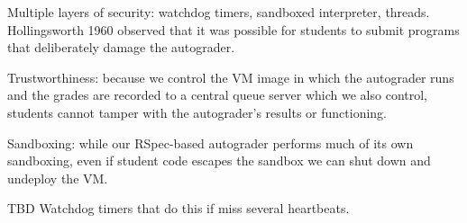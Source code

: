 Multiple layers of security: watchdog timers, sandboxed interpreter, threads. Hollingsworth 1960 observed that it was possible for students to submit programs that deliberately damage the autograder.

Trustworthiness: because we control the VM image in which the
  autograder runs and the grades are recorded to a central queue server
  which we also control, students cannot tamper with the autograder's
  results or functioning.

Sandboxing: while our RSpec-based autograder performs much of its
  own sandboxing, even if student code escapes the sandbox we can shut
  down and undeploy the VM.  

  TBD Watchdog timers that do this if miss several heartbeats.




